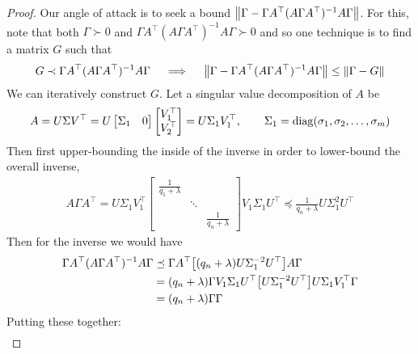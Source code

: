 \documentclass[12pt]{article}
\begin{document}
\begin{proof}
  Our angle of attack is to seek a bound
  \({\left\lVert\Gamma - \Gamma A^\top (A \Gamma A^\top)^{-1} A \Gamma\right\rVert}\).
  For this, note that both
  \(\Gamma \succ 0\)
  and \(\Gamma A^\top (A \Gamma A^\top)^{-1} A \Gamma \succ 0\)
  and so one technique is to find a matrix \(G\) such that
  \begin{align*}
    G \prec \Gamma A^\top (A \Gamma A^\top)^{-1} A \Gamma
      \quad \implies \quad
    {\left\lVert\Gamma - \Gamma A^\top (A \Gamma A^\top)^{-1} A \Gamma\right\rVert}
      \leq {\left\lVert\Gamma - G\right\rVert}
  \end{align*}
  We can iteratively construct \(G\).
  Let a singular value decomposition of \(A\) be
  \begin{align*}
    A = U \Sigma V^\top
      = U \begin{bmatrix} \Sigma_1 & 0 \end{bmatrix}
          \begin{bmatrix} V_1 ^\top \\ V_2 ^\top \end{bmatrix}
      = U \Sigma_1 V_1 ^\top,
      \qquad \Sigma_1 = \operatorname{diag} (\sigma_1, \sigma_2, \ldots, \sigma_m)
  \end{align*}
  Then first upper-bounding the inside of the inverse
  in order to lower-bound the overall inverse,
  \begin{align*}
    A \Gamma A^\top
      = U \Sigma_1 V_1 ^\top
          \begin{bmatrix}
            \frac{1}{q_1 + \lambda} & & \\
            & \ddots & \\
            & & \frac{1}{q_n + \lambda}
          \end{bmatrix}
          V_1 \Sigma_1 U^\top
      \preceq
        \frac{1}{q_n + \lambda} U \Sigma_1 ^2 U^\top
  \end{align*}
  Then for the inverse we would have
  \begin{align*}
    \Gamma A^\top (A \Gamma A^\top)^{-1} A \Gamma
      &\preceq
        \Gamma A^\top {\left[(q_n +\lambda) U\Sigma_1 ^{-2} U^\top\right]}A\Gamma \\
      &= {\left(q_n + \lambda\right)}
          \Gamma V_1 \Sigma_1 U^\top
            {\left[U \Sigma_1 ^{-2} U^\top\right]}
            U \Sigma_1 V_1 ^\top \Gamma \\
      &= {\left(q_n + \lambda\right)} \Gamma \Gamma
  \end{align*}
  Putting these together:
  \begin{align*}

\end{align*}
\end{proof}
\end{document}
